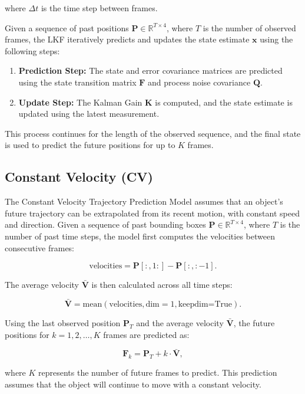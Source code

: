 \documentclass[12pt,oneside]{book} %
\begin{document}
where \(\Delta t\) is the time step between frames.

Given a sequence of past positions \(\mathbf{P} \in \mathbb{R}^{T \times 4}\),
where \(T\) is the number of observed frames, the LKF iteratively predicts and
updates the state estimate \(\mathbf{x}\) using the following steps:

\begin{enumerate}
    \item \textbf{Prediction Step:} The state and error covariance matrices are predicted using the state transition matrix \(\mathbf{F}\) and process noise covariance \(\mathbf{Q}\).
    \item \textbf{Update Step:} The Kalman Gain \(\mathbf{K}\) is computed, and the state estimate is updated using the latest measurement.
\end{enumerate}

This process continues for the length of the observed sequence, and the final
state is used to predict the future positions for up to \(K\) frames.

\subsection*{Constant Velocity (CV)}
The Constant Velocity Trajectory Prediction Model assumes that an object's
future trajectory can be extrapolated from its recent motion, with constant
speed and direction. Given a sequence of past bounding boxes \(\mathbf{P} \in
\mathbb{R}^{T \times 4}\), where \(T\) is the number of past time steps, the
model first computes the velocities between consecutive frames:

\[
    \text{velocities} = \mathbf{P}[:, 1:] - \mathbf{P}[:, :-1].
\]

The average velocity \(\bar{\mathbf{V}}\) is then calculated across all time
steps:

\[
    \bar{\mathbf{V}} = \text{mean}(\text{velocities}, \text{dim}=1, \text{keepdim=True}).
\]

Using the last observed position \(\mathbf{P}_T\) and the average velocity
\(\bar{\mathbf{V}}\), the future positions for \(k = 1, 2, \dots, K\) frames
are predicted as:

\[
    \mathbf{F}_k = \mathbf{P}_T + k \cdot \bar{\mathbf{V}},
\]

where \(K\) represents the number of future frames to predict. This prediction
assumes that the object will continue to move with a constant velocity.
\end{document}
